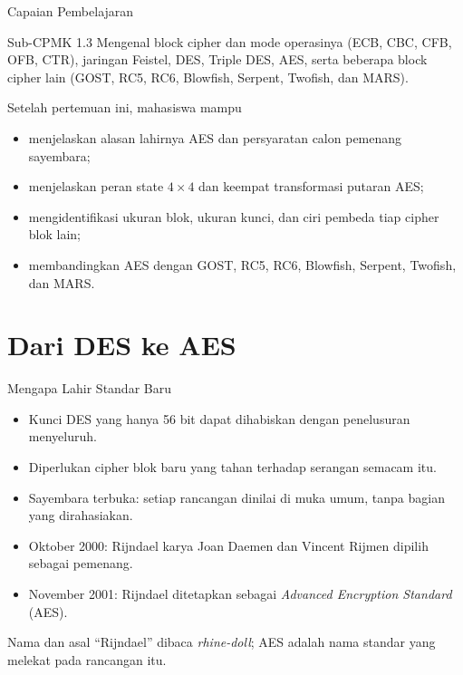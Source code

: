 \documentclass[aspectratio=169,11pt]{beamer}
\begin{document}
\begin{frame}{Capaian Pembelajaran}
    \begin{block}{Sub-CPMK 1.3}
        \footnotesize
        Mengenal block cipher dan mode operasinya (ECB, CBC, CFB, OFB,
        CTR), jaringan Feistel, DES, Triple DES, AES, serta beberapa block
        cipher lain (GOST, RC5, RC6, Blowfish, Serpent, Twofish, dan MARS).
    \end{block}
    \vspace{0.15cm}
    \begin{exampleblock}{Setelah pertemuan ini, mahasiswa mampu}
        \footnotesize
        \begin{itemize}
            \item menjelaskan alasan lahirnya AES dan persyaratan calon
                  pemenang sayembara;
            \item menjelaskan peran state $4 \times 4$ dan keempat
                  transformasi putaran AES;
            \item mengidentifikasi ukuran blok, ukuran kunci, dan ciri
                  pembeda tiap cipher blok lain;
            \item membandingkan AES dengan GOST, RC5, RC6, Blowfish,
                  Serpent, Twofish, dan MARS.
        \end{itemize}
    \end{exampleblock}
\end{frame}

\section{Dari DES ke AES}

\begin{frame}{Mengapa Lahir Standar Baru}
    \footnotesize
    \begin{itemize}
        \item Kunci DES yang hanya 56 bit dapat dihabiskan dengan
              penelusuran menyeluruh.
        \item Diperlukan cipher blok baru yang tahan terhadap serangan
              semacam itu.
        \item Sayembara terbuka: setiap rancangan dinilai di muka umum,
              tanpa bagian yang dirahasiakan.
        \item Oktober 2000: Rijndael karya Joan Daemen dan Vincent Rijmen
              dipilih sebagai pemenang.
        \item November 2001: Rijndael ditetapkan sebagai \textit{Advanced
              Encryption Standard} (AES).
    \end{itemize}
    \vspace{0.1cm}
    \begin{alertblock}{Nama dan asal}
        \footnotesize
        ``Rijndael'' dibaca \textit{rhine-doll}; AES adalah nama standar
        yang melekat pada rancangan itu.
    \end{alertblock}
\end{frame}
\end{document}
